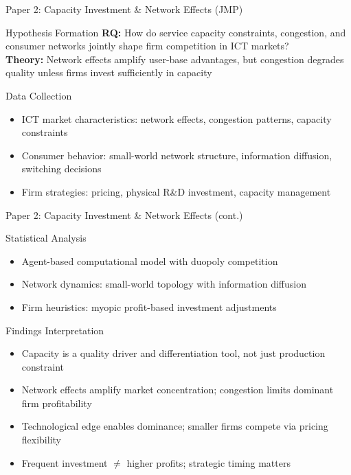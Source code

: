 \documentclass[10pt,aspectratio=169]{beamer}
\begin{document}
\begin{frame}{Paper 2: Capacity Investment \& Network Effects (JMP)}
  \begin{block}{Hypothesis Formation}
    \textbf{RQ:} How do service capacity constraints, congestion, and consumer networks jointly shape firm competition in ICT markets?
    \\
    \textbf{Theory:} Network effects amplify user-base advantages, but congestion degrades quality unless firms invest sufficiently in capacity
  \end{block}

  \begin{block}{Data Collection}
    \begin{itemize}
      \item ICT market characteristics: network effects, congestion patterns, capacity constraints
      \item Consumer behavior: small-world network structure, information diffusion, switching decisions
      \item Firm strategies: pricing, physical R\&D investment, capacity management
    \end{itemize}
  \end{block}
\end{frame}

\begin{frame}{Paper 2: Capacity Investment \& Network Effects (cont.)}
  \begin{block}{Statistical Analysis}
    \begin{itemize}
      \item Agent-based computational model with duopoly competition
      \item Network dynamics: small-world topology with information diffusion
      \item Firm heuristics: myopic profit-based investment adjustments
    \end{itemize}
  \end{block}

  \begin{alertblock}{Findings Interpretation}
    \begin{itemize}
      \item Capacity is a quality driver and differentiation tool, not just production constraint
      \item Network effects amplify market concentration; congestion limits dominant firm profitability
      \item Technological edge enables dominance; smaller firms compete via pricing flexibility
      \item Frequent investment $\neq$ higher profits; strategic timing matters
    \end{itemize}
  \end{alertblock}
\end{frame}
\end{document}
